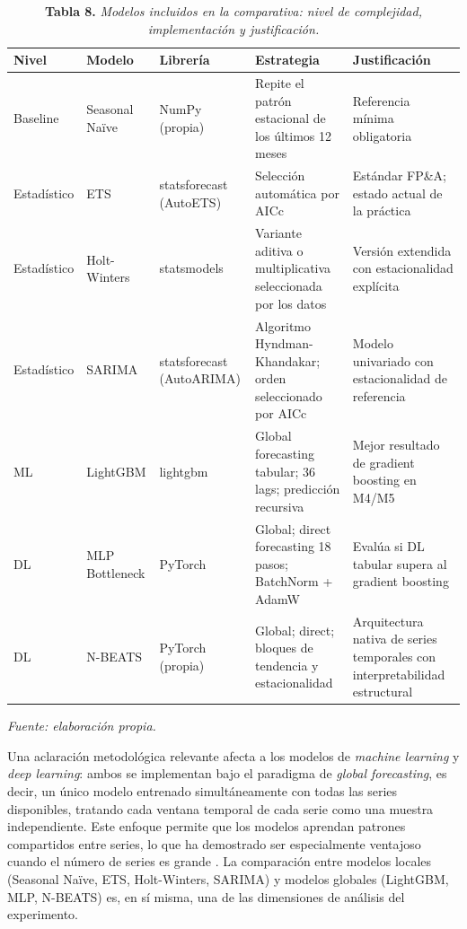 \begin{table}[H]
\caption{\textbf{Tabla 8.} \textit{Modelos incluidos en la comparativa: nivel de complejidad, implementación y justificación.}}
\label{tab:modelos_seleccion}
\vspace{4pt}
\small
\begin{tabular}{>{\raggedright\arraybackslash}p{1.8cm} >{\raggedright\arraybackslash}p{2.4cm} >{\raggedright\arraybackslash}p{2.6cm} >{\raggedright\arraybackslash}p{3.4cm} >{\raggedright\arraybackslash}p{3.4cm}}
\toprule
\textbf{Nivel} & \textbf{Modelo} & \textbf{Librería} & \textbf{Estrategia} & \textbf{Justificación} \\
\midrule
Baseline & Seasonal Naïve & NumPy (propia) & Repite el patrón estacional de los últimos 12 meses & Referencia mínima obligatoria \parencite{Hyndman2021} \\
Estadístico & ETS & statsforecast (AutoETS) & Selección automática por AICc & Estándar FP\&A; estado actual de la práctica \parencite{Armstrong2001} \\
Estadístico & Holt-Winters & statsmodels & Variante aditiva o multiplicativa seleccionada por los datos & Versión extendida con estacionalidad explícita \parencite{Hyndman2021} \\
Estadístico & SARIMA & statsforecast (AutoARIMA) & Algoritmo Hyndman-Khandakar; orden seleccionado por AICc & Modelo univariado con estacionalidad de referencia \parencite{Hyndman2021} \\
ML & LightGBM & lightgbm & Global forecasting tabular; 36 lags; predicción recursiva & Mejor resultado de gradient boosting en M4/M5 \parencite{Januschowski2020} \\
DL & MLP Bottleneck & PyTorch & Global; direct forecasting 18 pasos; BatchNorm + AdamW & Evalúa si DL tabular supera al gradient boosting \parencite{LimZohren2021} \\
DL & N-BEATS & PyTorch (propia) & Global; direct; bloques de tendencia y estacionalidad & Arquitectura nativa de series temporales con interpretabilidad estructural \parencite{Oreshkin2020} \\
\bottomrule
\end{tabular}
\normalsize
\vspace{4pt}

\small\textit{Fuente: elaboración propia.}
\end{table}

Una aclaración metodológica relevante afecta a los modelos de \textit{machine learning} y \textit{deep learning}: ambos se implementan bajo el paradigma de \textit{global forecasting}, es decir, un único modelo entrenado simultáneamente con todas las series disponibles, tratando cada ventana temporal de cada serie como una muestra independiente. Este enfoque permite que los modelos aprendan patrones compartidos entre series, lo que ha demostrado ser especialmente ventajoso cuando el número de series es grande \parencite{Januschowski2020}. La comparación entre modelos locales (Seasonal Naïve, ETS, Holt-Winters, SARIMA) y modelos globales (LightGBM, MLP, N-BEATS) es, en sí misma, una de las dimensiones de análisis del experimento.

